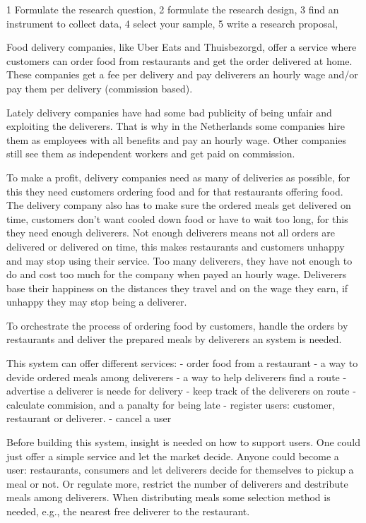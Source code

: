 
1 Formulate the research question,
2 formulate the research design,
3 find an instrument to collect data,
4 select your sample,
5 write a research proposal,


Food delivery companies, like Uber Eats and Thuisbezorgd, offer a service where customers can order food from restaurants and get the order delivered at home.
These companies get a fee per delivery and pay deliverers an hourly wage and/or pay them per delivery (commission based).

Lately delivery companies have had some bad publicity of being unfair and exploiting the deliverers.
That is why in the Netherlands some companies hire them as employees with all benefits and pay an hourly wage.
Other companies still see them as independent workers and get paid on commission.

To make a profit, delivery companies need as many of deliveries as possible, for this they need customers ordering food and for that restaurants offering food.
The delivery company also has to make sure the ordered meals get delivered on time, customers don't want cooled down food or have to wait too long,
for this they need enough deliverers.
Not enough deliverers means not all orders are delivered or delivered on time, this makes restaurants and customers unhappy and may stop using their service.
Too many deliverers, they have not enough to do and cost too much for the company when payed an hourly wage.
Deliverers base their happiness on the distances they travel and on the wage they earn, if unhappy they may stop being a deliverer.

To orchestrate the process of ordering food by customers, handle the orders by restaurants and deliver the prepared meals by deliverers an system is needed.

This system can offer different services:
- order food from a restaurant
- a way to devide ordered meals among deliverers
- a way to help deliverers find a route
- advertise a deliverer is neede for delivery
- keep track of the deliverers on route
- calculate commision, and a panalty for being late
- register users: customer, restaurant or deliverer.
- cancel a user

Before building this system, insight is needed on how to support users.
One could just offer a simple service and let the market decide.
Anyone could become a user: restaurants, consumers and let deliverers decide for themselves to pickup a meal or not.
Or regulate more, restrict the number of deliverers and destribute meals among deliverers.
When distributing meals some selection method is needed, e.g., the nearest free deliverer to the restaurant.

